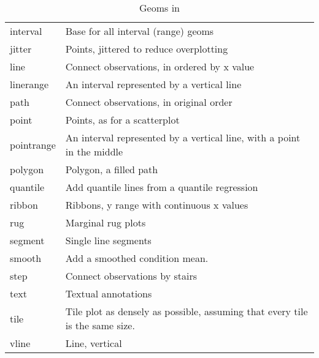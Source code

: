 \begin{table}
\begin{center}
\begin{tabular}{lp{3in}}
      interval     & Base for all interval (range) geoms                                          \\
      jitter       & Points, jittered to reduce overplotting                                      \\
      line         & Connect observations, in ordered by x value                                  \\
      linerange    & An interval represented by a vertical line                                   \\
      path         & Connect observations, in original order                                      \\
      point        & Points, as for a scatterplot                                                 \\
      pointrange   & An interval represented by a vertical line, with a point in the middle       \\
      polygon      & Polygon, a filled path                                                       \\
      quantile     & Add quantile lines from a quantile regression                                \\
      ribbon       & Ribbons, y range with continuous x values                                    \\
      rug          & Marginal rug plots                                                           \\
      segment      & Single line segments                                                         \\
      smooth       & Add a smoothed condition mean.                                               \\
      step         & Connect observations by stairs                                               \\
      text         & Textual annotations                                                          \\
      tile         & Tile plot as densely as possible, assuming that every tile is the same size. \\
      vline        & Line, vertical                                                               \\
  
      \bottomrule
  \end{tabular}
  \end{center}
  \caption{Geoms in \ggplot}
  \label{tbl:geoms}
\end{table}


